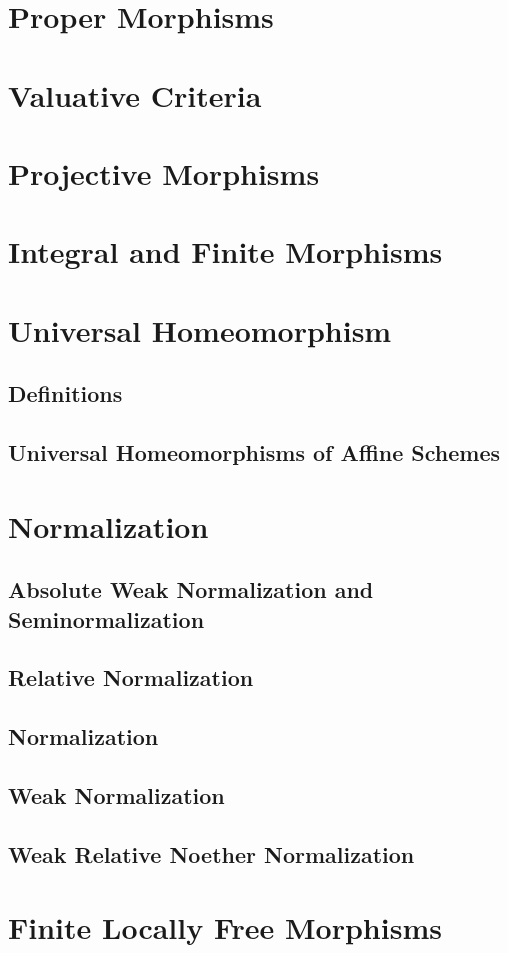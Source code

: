 \documentclass[Total.tex]{subfiles}
\begin{document}
		\section{Proper Morphisms}
		\section{Valuative Criteria}
		\section{Projective Morphisms}
		\section{Integral and Finite Morphisms}
		\section{Universal Homeomorphism}
			\subsection{Definitions}
			\subsection{Universal Homeomorphisms of Affine Schemes}
		\section{Normalization}
			\subsection{Absolute Weak Normalization and Seminormalization}
			\subsection{Relative Normalization}
			\subsection{Normalization}
			\subsection{Weak Normalization}
			\subsection{Weak Relative Noether Normalization}
		\section{Finite Locally Free Morphisms}
\end{document}
